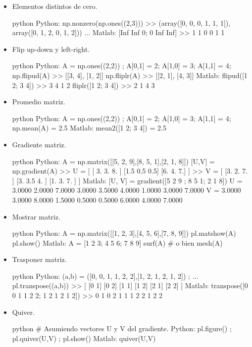 \documentclass[letterpaper,11pt]{article} %
\begin{document}
\begin{itemize}
	\item{
		Elementos distintos de cero.
		\begin{sourcecode}{python}{}
Python: np.nonzero(np.ones((2,3)))
>>	(array([0, 0, 0, 1, 1, 1]), array([0, 1, 2, 0, 1, 2])) ...
Matlab: [Inf Inf 0; 0 Inf Inf]
>>	1 1 0
0 1 1
\end{sourcecode}
	}
	
	\newpage
	\item{
		Flip up-down y left-right.
		\begin{sourcecode}{python}{}
Python: A = np.ones((2,2)) ; A[0,1] = 2; A[1,0] = 3; A[1,1] = 4;
np.flipud(A)
>>	[[3, 4],
[1, 2]]
np.fliplr(A)
>>	[[2, 1],
[4, 3]]
Matlab: flipud([1 2; 3 4])
>>	3 4
1 2
fliplr([1 2; 3 4])
>>	2 1
4 3
\end{sourcecode}
	}
	
	\item{
		Promedio matriz.
		\begin{sourcecode}{python}{}
Python: A = np.ones((2,2)) ; A[0,1] = 2; A[1,0] = 3; A[1,1] = 4;
np.mean(A) = 2.5
Matlab: mean2([1 2; 3 4]) = 2.5
\end{sourcecode}
	}
	
	\item{
		Gradiente matriz.
		\begin{sourcecode}{python}{}
Python: A = np.matrix([[5, 2, 9],[8, 5, 1],[2, 1, 8]])
[U,V] = np.gradient(A)
>>	U = [
[ 3. 3. 8. ]
[1.5 0.5 0.5]
[6. 4. 7.]
]
>>	V = [
[3. 2. 7. ]
[3. 3.5 4. ]
[1. 3. 7. ]
]
Matlab: [U, V] = gradient([5 2 9 ; 8 5 1; 2 1 8])
U =
3.0000 2.0000 7.0000
3.0000 3.5000 4.0000
1.0000 3.0000 7.0000
V =
3.0000 3.0000 8.0000
1.5000 0.5000 0.5000
6.0000 4.0000 7.0000
\end{sourcecode}
	}
	
	\item{
		Mostrar matriz.
		\begin{sourcecode}{python}{}
Python: A = np.matrix([[1, 2, 3],[4, 5, 6],[7, 8, 9]])
pl.matshow(A)
pl.show()
Matlab: A = [1 2 3; 4 5 6; 7 8 9]
surf(A) # o bien mesh(A)
\end{sourcecode}
	}
	
	\item{
		Trasponer matriz.
		\begin{sourcecode}{python}{}
Python: (a,b) = ([0, 0, 1, 1, 2, 2],[1, 2, 1, 2, 1, 2]) ; ...
pl.transpose((a,b))
>>	[
[0 1]
[0 2]
[1 1]
[1 2]
[2 1]
[2 2]
]
Matlab: transpose([0 0 1 1 2 2; 1 2 1 2 1 2])
>>	0 1
0 2
1 1
1 2
2 1
2 2
\end{sourcecode}
	}
	
	\item{
		Quiver.
		\begin{sourcecode}{python}{}
# Asumiendo vectores U y V del gradiente.
Python: pl.figure() ; pl.quiver(U,V) ; pl.show()
Matlab: quiver(U,V)
\end{sourcecode}
	}
	
\end{itemize}

\end{document}
